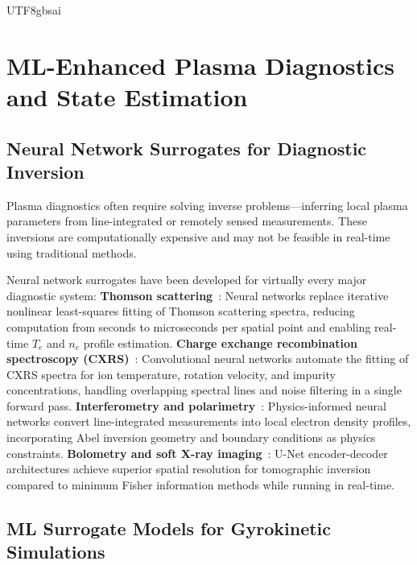 \documentclass[12pt,a4paper]{article}
\begin{document}
\begin{CJK}{UTF8}{gbsai}
\section{ML-Enhanced Plasma Diagnostics and State Estimation}

\subsection{Neural Network Surrogates for Diagnostic Inversion}

Plasma diagnostics often require solving inverse problems---inferring local plasma parameters from line-integrated or remotely sensed measurements. These inversions are computationally expensive and may not be feasible in real-time using traditional methods.

Neural network surrogates have been developed for virtually every major diagnostic system: \textbf{Thomson scattering}~\citep{Parra2024}: Neural networks replace iterative nonlinear least-squares fitting of Thomson scattering spectra, reducing computation from seconds to microseconds per spatial point and enabling real-time $T_e$ and $n_e$ profile estimation. \textbf{Charge exchange recombination spectroscopy (CXRS)}~\citep{Odstrcil2024}: Convolutional neural networks automate the fitting of CXRS spectra for ion temperature, rotation velocity, and impurity concentrations, handling overlapping spectral lines and noise filtering in a single forward pass. \textbf{Interferometry and polarimetry}~\citep{Rivero2024}: Physics-informed neural networks convert line-integrated measurements into local electron density profiles, incorporating Abel inversion geometry and boundary conditions as physics constraints. \textbf{Bolometry and soft X-ray imaging}~\citep{Verdoolaege2024}: U-Net encoder-decoder architectures achieve superior spatial resolution for tomographic inversion compared to minimum Fisher information methods while running in real-time.

\subsection{ML Surrogate Models for Gyrokinetic Simulations}


\end{CJK}
\end{document}
